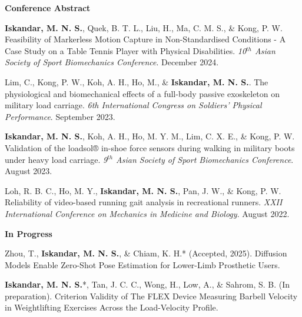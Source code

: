 \documentclass[../main.tex]{subfiles}
\begin{document}
        \textbf{Conference Abstract}
        \def\labelprefix{CA}
        \begin{etaremune}
            \item\label{conference_abstract: assbTableTennisMarkerless} {\textbf{Iskandar, M. N. S.}, Quek, B. T. L., Liu, H., Ma, C. M. S., \& Kong, P. W. Feasibility of Markerless Motion Capture in Non-Standardised Conditions - A Case Study on a Table Tennis Player with Physical Disabilities. \textit{10$^{th}$ Asian Society of Sport Biomechanics Conference}. December 2024.}
            
            \item\label{conference_abstract: cherylMilitary} {Lim, C., Kong, P. W., Koh, A. H., Ho, M., \& \textbf{Iskandar, M. N. S.}. The physiological and biomechanical effects of a full-body passive exoskeleton on military load carriage. \textit{6th International Congress on Soldiers' Physical Performance}. September 2023. {\href{https://cdn.asp.events/CLIENT_CLDD_9BDAB70C_5056_B733_4934A7872C9C46B0/sites/dsei-2023/media/ICSPP_program_book.pdf}{\faFilePdfO}}}

            \item\label{conference_abstract: assbLoadsolValidation} {\textbf{Iskandar, M. N. S.}, Koh, A. H., Ho, M. Y. M., Lim, C. X. E., \& Kong, P. W. Validation of the loadsol® in-shoe force sensors during walking in military boots under heavy load carriage. \textit{9$^{th}$ Asian Society of Sport Biomechanics Conference}. August 2023.}
            
            \item\label{conference_abstract: rayReliability} {Loh, R. B. C., Ho, M. Y., \textbf{Iskandar, M. N. S.}, Pan, J. W., \& Kong, P. W. Reliability of video-based running gait analysis in recreational runners. \textit{XXII International Conference on Mechanics in Medicine and Biology}. August 2022.}
        \end{etaremune}
        
        \textbf{In Progress}
        \def\labelprefix{P}
        \begin{etaremune}                     
            \item\label{article: diffusion_openpose}{Zhou, T., \textbf{Iskandar, M. N. S.}, \& Chiam, K. H.* (Accepted, 2025). Diffusion Models Enable Zero-Shot Pose Estimation for Lower-Limb Prosthetic Users. \href{https://arxiv.org/abs/2312.07854}{\faFilePdfO}}
            
            \item\label{article: fyp}{\textbf{Iskandar, M. N. S.}*, Tan, J. C. C., Wong, H., Low, A., \& Sahrom, S. B. (In preparation). Criterion Validity of The FLEX Device Measuring Barbell Velocity in Weightlifting Exercises Across the Load-Velocity Profile. \href{https://github.com/Shahril-Iskandar/publication-validity-flex-vbt}{\faGithub}}
        \end{etaremune}
        
  \resumeSubHeadingListEnd
\end{document}

